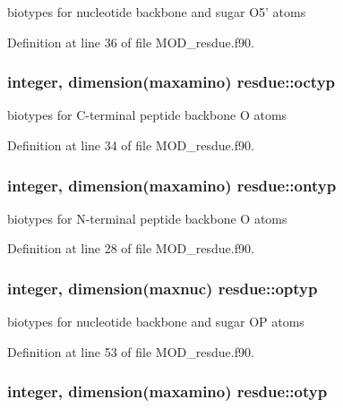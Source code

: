 biotypes for nucleotide backbone and sugar O5' atoms 



Definition at line 36 of file M\-O\-D\-\_\-resdue.\-f90.

\hypertarget{classresdue_ad241d88a4adc78b939a86353ebf03140}{
\subsubsection[{octyp}]{\setlength{\rightskip}{0pt plus 5cm}integer, dimension(maxamino) resdue\-::octyp}}\label{classresdue_ad241d88a4adc78b939a86353ebf03140}


biotypes for C-\/terminal peptide backbone O atoms 



Definition at line 34 of file M\-O\-D\-\_\-resdue.\-f90.

\hypertarget{classresdue_a2170a9a55ac22ff0c519b4026bb15fe6}{
\subsubsection[{ontyp}]{\setlength{\rightskip}{0pt plus 5cm}integer, dimension(maxamino) resdue\-::ontyp}}\label{classresdue_a2170a9a55ac22ff0c519b4026bb15fe6}


biotypes for N-\/terminal peptide backbone O atoms 



Definition at line 28 of file M\-O\-D\-\_\-resdue.\-f90.

\hypertarget{classresdue_a6286d8a51141e8261fe20877c7910220}{
\subsubsection[{optyp}]{\setlength{\rightskip}{0pt plus 5cm}integer, dimension(maxnuc) resdue\-::optyp}}\label{classresdue_a6286d8a51141e8261fe20877c7910220}


biotypes for nucleotide backbone and sugar O\-P atoms 



Definition at line 53 of file M\-O\-D\-\_\-resdue.\-f90.

\hypertarget{classresdue_ae43a84a521235c9e35ba02a293139a96}{
\subsubsection[{otyp}]{\setlength{\rightskip}{0pt plus 5cm}integer, dimension(maxamino) resdue\-::otyp}}\label{classresdue_ae43a84a521235c9e35ba02a293139a96}


